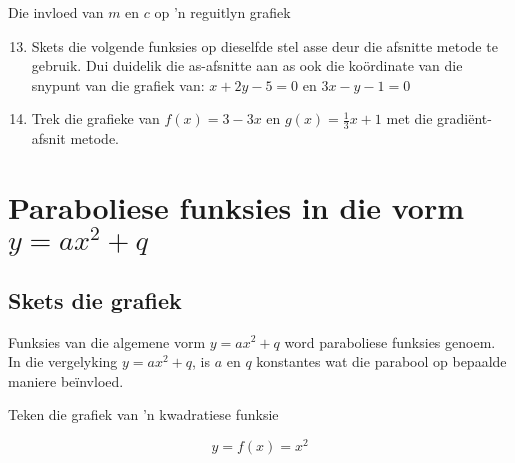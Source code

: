 \begin{Ondersoek}{Die invloed van $m$ en $c$ op 'n reguitlyn grafiek}
\begin{exercises}{}
{\begin{figure}[H]
\end{figure}  
            
\begin{enumerate}[noitemsep, label=\textbf{\arabic*}. ] 
\setcounter{enumi}{12}
\item Skets die volgende funksies op dieselfde stel asse deur die afsnitte metode te gebruik. Dui duidelik die as-afsnitte aan as ook die ko\"ordinate van die snypunt van die grafiek van: $x+2y-5=0$ en $3x-y-1=0$
\item Trek die grafieke van $f(x)=3-3x$ en $g(x)=\frac{1}{3}x+1$ met die gradi\"ent-afsnit metode.
\end{enumerate}

}
\end{exercises}
   

\section{Paraboliese funksies in die vorm $y=a{x}^{2}+q$}
\subsection*{Skets die grafiek}         
Funksies van die algemene vorm  $y=a{x}^{2}+q$  word paraboliese funksies genoem. In die vergelyking $y=a{x}^{2}+q$, is $a$ en $q$ konstantes wat die parabool op bepaalde maniere be\"invloed. 


\begin{wex}{Teken die grafiek van 'n kwadratiese funksie}
{
\begin{equation*}
 y = f(x) = x^{2}
\end{equation*}

}
\end{wex}
\end{Ondersoek}
